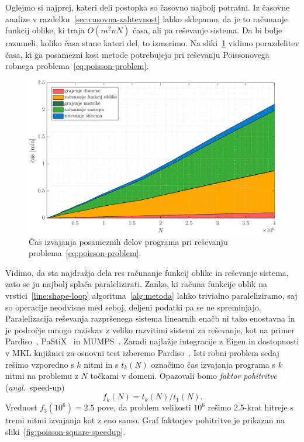\documentclass[12pt,a4paper,twoside]{article}
\theoremstyle{definition} %
\theoremstyle{plain} %
\numberwithin{equation}{section}
\newcommand{\ang}[1]{(\hspace{-1.5px}\textit{angl.}\ #1)}
\newlength{\iw}
\begin{document}
Oglejmo si najprej, kateri deli postopka so časovno najbolj potratni. Iz časovne analize v
razdelku~\ref{sec:casovna-zahtevnost} lahko sklepamo, da je to računanje funkcij oblike,
ki traja $O(m^2n N)$ časa, ali pa reševanje sistema. Da bi bolje razumeli, koliko časa stane kateri
del, to izmerimo. Na sliki~\ref{fig:poisson-square-time-distribution} vidimo porazdelitev časa, ki ga posamezni
kosi metode potrebujejo pri reševanju Poissonovega robnega problema~\eqref{eq:poisson-problem}.

\begin{figure}[!h]
  \centering
  \includegraphics[width=\iw]{images/poisson_square_time_distribution_1.pdf}
  \caption[Čas izvajanja delov programa pri reševanju Poissonove enačbe.]{Čas
  izvajanja posameznih delov programa pri reševanju
  problema~\eqref{eq:poisson-problem}.}
  \label{fig:poisson-square-time-distribution}
\end{figure}

Vidimo, da sta najdražja dela res računanje funkcij oblike in reševanje sistema, zato se ju najbolj
splača paralelizirati. Zanko, ki računa funkcije oblik na vrstici~\ref{line:shape-loop}
algoritma~\ref{alg:metoda} lahko trivialno paraleliziramo, saj so operacije neodvisne med seboj,
deljeni podatki pa se ne spreminjajo. Paralelizacija reševanja razpršenega sistema linearnih enačb
ni tako enostavna in je področje mnogo raziskav z veliko razvitimi sistemi za reševanje, kot na
primer Pardiso~\cite{pardiso}, PaStiX~\cite{henon2002pastix} in MUMPS~\cite{amestoy2000mumps}.
Zaradi najlažje integracije z Eigen in dostopnosti v MKL knjižnici za osnovni test izberemo
Pardiso~\cite{pardiso}. Isti robni problem sedaj rešimo vzporedno s $k$ nitmi in s $t_k(N)$ označimo
čas izvajanja programa s $k$ nitmi na problemu z $N$ točkami v domeni. Opazovali bomo \emph{faktor
pohitritve} \ang{speed-up}
\begin{equation}
   f_k(N) = t_k(N) / t_1(N).
\end{equation}
Vrednost $f_3(10^6) = 2.5$ pove, da problem velikosti $10^6$ rešimo 2.5-krat hitreje s tremi
nitmi izvajanja kot z eno samo. Graf faktorjev pohitritve je prikazan na
sliki~\ref{fig:poisson-square-speedup}.
\end{document}
